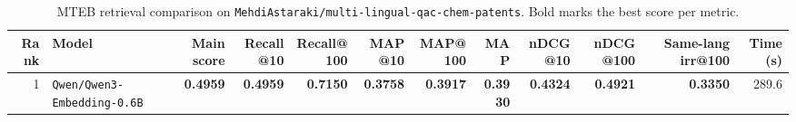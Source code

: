 \begin{table}[t]
\centering
\small
\begin{tabular}{r l r r r r r r r r r r}
\hline
Rank & Model & Main score & Recall@10 & Recall@100 & MAP@10 & MAP@100 & MAP & nDCG@10 & nDCG@100 & Same-lang irr@100 & Time (s) \\
\hline
1 & \texttt{Qwen/Qwen3-Embedding-0.6B} & \textbf{0.4959} & \textbf{0.4959} & \textbf{0.7150} & \textbf{0.3758} & \textbf{0.3917} & \textbf{0.3930} & \textbf{0.4324} & \textbf{0.4921} & \textbf{0.3350} & 289.6 \\
\hline
\end{tabular}
\caption{MTEB retrieval comparison on \texttt{MehdiAstaraki/multi-lingual-qac-chem-patents}. Bold marks the best score per metric.}
\label{tab:mteb-model-comparison}
\end{table}
